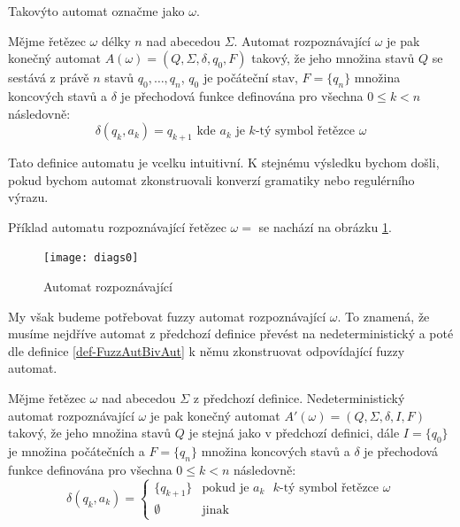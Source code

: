 \documentclass[a4paper,10pt]{article}
\begin{document}
Takovýto automat označme jako  $\omega$.
\begin{definition}
  Mějme řetězec $\omega$ délky $n$ nad abecedou $\Sigma$. Automat rozpoznávající $\omega$ je pak konečný automat $A(\omega) = ( Q, \Sigma, \delta, q_0, F )$ takový, že jeho množina stavů $Q$ se sestává z právě $n$ stavů $q_0, \dots, q_n$, $q_0$ je počáteční stav, $F = \{ q_n \}$ množina koncových stavů a $\delta$ je přechodová funkce definována pro všechna $0 \leq k < n$ následovně:
  $$
    \delta(q_{k}, a_k) = q_{k+1} \text{ kde $a_k$ je $k$-tý symbol řetězce $\omega$}
  $$
\end{definition}

Tato definice automatu je vcelku intuitivní. K stejnému výsledku bychom došli, pokud bychom automat zkonstruovali konverzí gramatiky nebo regulérního výrazu. 

\begin{example}
 Příklad automatu rozpoznávající řetězec $\omega = $  se nachází na obrázku \ref{diag-AutRozpHell}.  

  \begin{figure}
    \texttt{[image: diags0]}
    \caption{Automat rozpoznávající } \label{diag-AutRozpHell}
  \end{figure}
\end{example}

My však budeme potřebovat fuzzy automat rozpoznávající $\omega$. To znamená, že musíme nejdříve automat z předchozí definice převést na nedeterministický a poté dle definice \ref{def-FuzzAutBivAut} k němu zkonstruovat odpovídající fuzzy automat.

\begin{definition} \label{def-AutRozpOme}
  Mějme řetězec $\omega$ nad abecedou $\Sigma$ z předchozí definice. Nedeterministický automat rozpoznávající $\omega$ je pak konečný automat $A'(\omega) = ( Q, \Sigma, \delta, I, F )$ takový, že jeho množina stavů $Q$ je stejná jako v předchozí definici, dále $I = \{ q_0 \}$ je množina počátečních a $F = \{ q_n \}$ množina koncových stavů a $\delta$ je přechodová funkce definována pro všechna $0 \leq k < n$ následovně:
  $$
  \delta(q_{k}, a_k) = 
  \begin{cases}
      \{ q_{k+1} \}	&\text{pokud je $a_k$ $k$-tý symbol řetězce $\omega$} \\
      \emptyset	&\text{jinak}
  \end{cases}
  $$
\end{definition}
\end{document}

